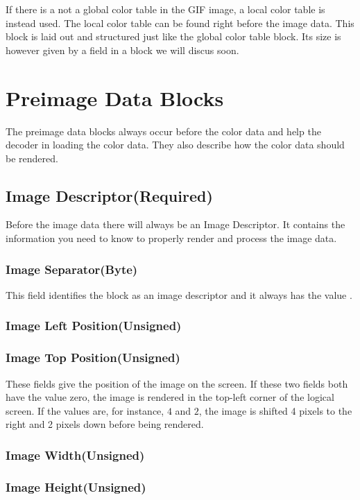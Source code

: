 If there is a not a global color table in the GIF image, a local color
table is instead used. The local color table can be found right before
the image data. This block is laid out and structured just like the
global color table block. Its size is however given by a field in a
block we will discus soon.

\section{Preimage Data Blocks}

The preimage data blocks always occur before the color data and help
the decoder in loading the color data. They also describe how the
color data should be rendered.

\subsection{Image Descriptor(Required)}

Before the image data there will always be an Image Descriptor. It
contains the information you need to know to properly render and
process the image data.

\subsubsection{Image Separator(Byte)}

This field identifies the block as an image descriptor and it always
has the value .

\subsubsection{Image Left Position(Unsigned)}
\subsubsection{Image Top Position(Unsigned)}

These fields give the position of the image on the screen. If these
two fields both have the value zero, the image is rendered in the
top-left corner of the logical screen. If the values are, for
instance, $4$ and $2$, the image is shifted 4 pixels to the right and 2
pixels down before being rendered.

\subsubsection{Image Width(Unsigned)}
\subsubsection{Image Height(Unsigned)}

